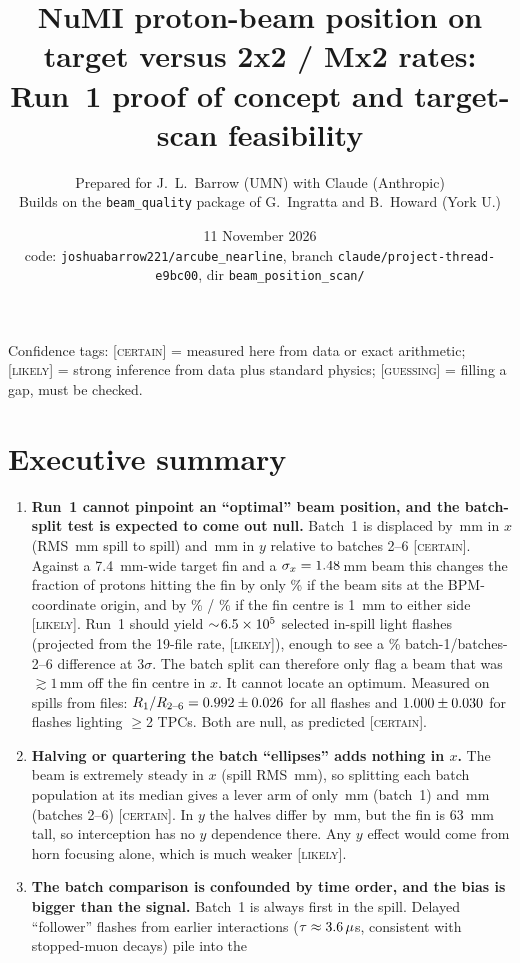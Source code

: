 \documentclass[11pt]{article}
\title{NuMI proton-beam position on target versus 2x2 / Mx2 rates:\\
Run~1 proof of concept and target-scan feasibility}
\author{Prepared for J.~L.~Barrow (UMN) with Claude (Anthropic)\\
\small Builds on the \texttt{beam\_quality} package of G.~Ingratta and B.~Howard (York U.)}
\date{11 November 2026\\ \small code: \texttt{joshuabarrow221/arcube\_nearline}, branch \texttt{claude/project-thread-e9bc00}, dir \texttt{beam\_position\_scan/}}
\newcommand{\CERT}{\textsc{[certain]}}
\newcommand{\LIK}{\textsc{[likely]}}
\newcommand{\GUESS}{\textsc{[guessing]}}
\begin{document}
\maketitle

\noindent Confidence tags: \CERT{} = measured here from data or exact arithmetic;
\LIK{} = strong inference from data plus standard physics; \GUESS{} = filling a gap,
must be checked.

\section{Executive summary}
\begin{enumerate}
\item \textbf{Run~1 cannot pinpoint an ``optimal'' beam position, and the batch-split
test is expected to come out null.} Batch~1 is displaced by \BoneDx\,mm in $x$
(RMS \BoneDxRms\,mm spill to spill) and \BoneDy\,mm in $y$ relative to batches 2--6 \CERT.
Against a \SI{7.4}{mm}-wide target fin and a $\sigma_x=1.48$\,mm beam this changes the
fraction of protons hitting the fin by only \PredAzero\% if the beam sits at the
BPM-coordinate origin, and by \PredAmone\% / \PredAone\% if the fin centre is
\SI{1}{mm} to either side \LIK. Run~1 should yield $\sim\!6.5\times10^{5}$ selected in-spill
light flashes (projected from the 19-file rate, \LIK), enough to see a \FRrunOneMinDelta\% batch-1/batches-2--6 difference at
$3\sigma$. The batch split can therefore only flag a beam that was $\gtrsim1$\,mm off the
fin centre in $x$. It cannot locate an optimum. Measured on \BRspills{} spills from
\BRfiles{} files: $R_1/R_{2\text{--}6}=0.992\pm0.026$ for all flashes and
$1.000\pm0.030$ for flashes lighting $\geq$2 TPCs. Both are null, as predicted
\CERT.
\item \textbf{Halving or quartering the batch ``ellipses'' adds nothing in $x$.} The beam is
extremely steady in $x$ (spill RMS \PosXrms\,mm), so splitting each batch population at its
median gives a lever arm of only \LevBoneXhalf\,mm (batch~1) and \LevRestXhalf\,mm
(batches 2--6) \CERT. In $y$ the halves differ by \LevRestYhalf\,mm, but the fin is
\SI{63}{mm} tall, so interception has no $y$ dependence there. Any $y$ effect would come
from horn focusing alone, which is much weaker \LIK.
\item \textbf{The batch comparison is confounded by time order, and the bias is bigger than
the signal.} Batch~1 is always first in the spill. Delayed ``follower'' flashes from earlier
interactions ($\tau\approx3.6\,\mu$s, consistent with stopped-muon decays) pile into the

\end{enumerate}
\end{document}

